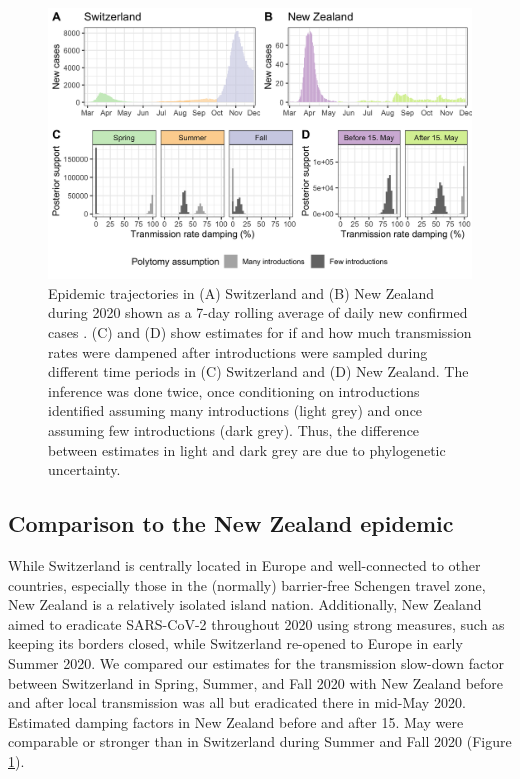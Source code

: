 \documentclass[9pt,twoside,lineno]{pnas-new} %
\begin{document}
\begin{figure}[h!]
\centering
\includegraphics[width=0.75\linewidth]{figures/contact_tracing_factors_no_sampUB_compared_to_cases.png}
\caption{Epidemic trajectories in (A) Switzerland and (B) New Zealand during 2020 shown as a 7-day rolling average of daily new confirmed cases \cite{Appel}. (C) and (D) show estimates for if and how much transmission rates were dampened after introductions were sampled during different time periods in (C) Switzerland and (D) New Zealand. The inference was done twice, once conditioning on introductions identified assuming many introductions (light grey) and once assuming few introductions (dark grey). Thus, the difference between estimates in light and dark grey are due to phylogenetic uncertainty.}  
\label{fig:scale-factor}
\end{figure}

\subsection{Comparison to the New Zealand epidemic}
While Switzerland is centrally located in Europe and well-connected to other countries, especially those in the (normally) barrier-free Schengen travel zone, New Zealand is a relatively isolated island nation. Additionally, New Zealand aimed to eradicate SARS-CoV-2 throughout 2020 using strong measures, such as keeping its borders closed, while Switzerland re-opened to Europe in early Summer 2020. We compared our estimates for the transmission slow-down factor between Switzerland in Spring, Summer, and Fall 2020 with New Zealand before and after local transmission was all but eradicated there in mid-May 2020. Estimated damping factors in New Zealand before and after 15. May were comparable or stronger than in Switzerland during Summer and Fall 2020 (Figure \ref{fig:scale-factor}).
\end{document}

